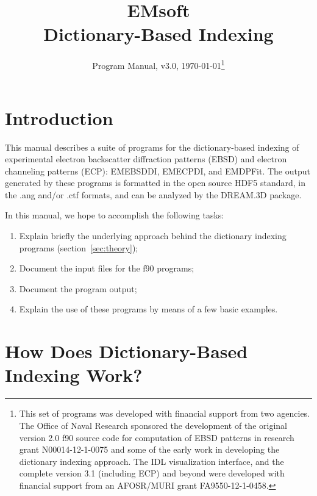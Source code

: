 \documentclass[DIV=calc, paper=letter, fontsize=11pt]{scrartcl}	 %
\title{EMsoft\\ Dictionary-Based Indexing} %
\author{\vspace*{-0.7in}} %
\date{Program Manual, v3.0, \today\protect\footnote{This set of programs was developed with financial support from two agencies. 
The Office of Naval Research sponsored the development of the original version 2.0 f90 source code for computation of EBSD patterns in research 
grant N00014-12-1-0075 and some of the early work in developing the dictionary indexing approach.  
The IDL visualization interface, and the complete version 3.1 (including ECP) and beyond were developed with financial 
support from an AFOSR/MURI grant FA9550-12-1-0458.}}
\begin{document}
\maketitle


\begin{figure*}[h]
\leavevmode\centering
\epsfxsize=4.0in
\end{figure*}

\renewcommand{\contentsname}{Table of Contents}
{\vspace*{-0.1in}\footnotesize\tableofcontents}

\newpage
\section{Introduction}
This manual describes a suite of programs for the dictionary-based indexing of experimental electron backscatter diffraction patterns (EBSD) and electron channeling patterns (ECP):
\textsf{EMEBSDDI}, \textsf{EMECPDI}, and \textsf{EMDPFit}.
The output generated by these programs is formatted in the open source HDF5 standard, in the \textsf{.ang} and/or \textsf{.ctf} formats, and
can be analyzed by the DREAM.3D package.

In this manual, we hope to accomplish the following tasks:
\begin{enumerate}
	\item Explain briefly the underlying approach behind the dictionary indexing programs (section~\ref{sec:theory});
	\item Document the input files for the f90 programs; %
	\item Document the program output; %
	\item Explain the use of these programs by means of a few basic examples. %
\end{enumerate}

\newpage
\section{How Does Dictionary-Based Indexing Work?\label{sec:theory}}
\end{document}
